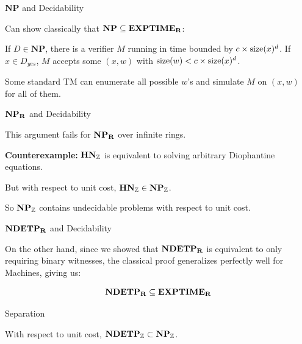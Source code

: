 \documentclass[c]{beamer}
\begin{document}
\begin{frame}{$\mathbf{NP}$ and Decidability}

  Can show classically that $\mathbf{NP} \subseteq \mathbf{EXPTIME_R}$:

  \vspace{\baselineskip}

  If $D \in \mathbf{NP}$, there is a verifier $M$ running in time
  bounded by $c \times \text{size}(x)^d$.  If $x \in D_{yes}$, $M$ accepts some
  $(x,w)$ with $\text{size}(w) < c \times \text{size}(x)^d$. \pause

  \vspace{\baselineskip}

  Some standard TM can enumerate all possible $w$'s and simulate $M$
  on $(x,w)$ for all of them.
\end{frame}

\begin{frame}{$\mathbf{NP_R}$ and Decidability}

  This argument fails for $\mathbf{NP_R}$ over infinite rings.\pause

  \vspace{\baselineskip}

  \textbf{Counterexample:} $\mathbf{HN}_{\mathbb{Z}}$ is equivalent to solving
  arbitrary Diophantine equations. \pause

  \vspace{\baselineskip}

  But with respect to unit cost, $\mathbf{HN}_{\mathbb{Z}} \in
  \mathbf{NP_{\mathbb{Z}}}$.

  \vspace{\baselineskip}

  So $\mathbf{NP_{\mathbb{Z}}}$ contains undecidable problems with respect to
  unit cost.

\end{frame}

\begin{frame}{$\mathbf{NDETP_R}$ and Decidability}

  On the other hand, since we showed that $\mathbf{NDETP_R}$ is equivalent to
  only requiring binary witnesses, the classical proof generalizes
  perfectly well for \ndet Machines, giving us:

  $$\mathbf{NDETP_R} \subseteq \mathbf{EXPTIME_R}$$
  
\end{frame}

\begin{frame}{Separation}
  \begin{corollary}
    With respect to unit cost, $\mathbf{NDETP_{\mathbb{Z}}} \subset \mathbf{NP_{\mathbb{Z}}}$.
  \end{corollary}
\end{frame}
\end{document}
